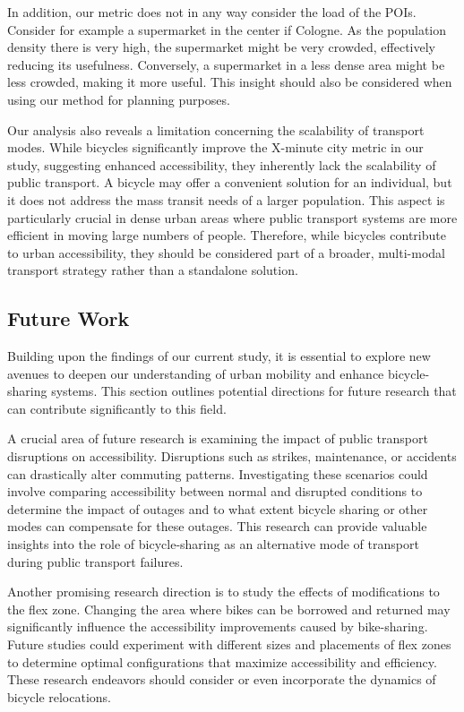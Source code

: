 In addition, our metric does not in any way consider the load of the POIs.
Consider for example a supermarket in the center if Cologne.
As the population density there is very high, the supermarket might be very crowded, effectively reducing its usefulness.
Conversely, a supermarket in a less dense area might be less crowded, making it more useful.
This insight should also be considered when using our method for planning purposes.

Our analysis also reveals a limitation concerning the scalability of transport modes. 
While bicycles significantly improve the X-minute city metric in our study, suggesting enhanced accessibility, they inherently lack the scalability of public transport. 
A bicycle may offer a convenient solution for an individual, but it does not address the mass transit needs of a larger population. 
This aspect is particularly crucial in dense urban areas where public transport systems are more efficient in moving large numbers of people. 
Therefore, while bicycles contribute to urban accessibility, they should be considered part of a broader, multi-modal transport strategy rather than a standalone solution.


\subsection{Future Work}
\label{sec:future_work}

Building upon the findings of our current study, it is essential to explore new avenues to deepen our understanding of urban mobility and enhance bicycle-sharing systems. 
This section outlines potential directions for future research that can contribute significantly to this field.

A crucial area of future research is examining the impact of public transport disruptions on accessibility.
Disruptions such as strikes, maintenance, or accidents can drastically alter commuting patterns. 
Investigating these scenarios could involve comparing accessibility between normal and disrupted conditions to determine the impact of outages and to what extent bicycle sharing or other modes can compensate for these outages.
This research can provide valuable insights into the role of bicycle-sharing as an alternative mode of transport during public transport failures.

Another promising research direction is to study the effects of modifications to the flex zone. 
Changing the area where bikes can be borrowed and returned may significantly influence the accessibility improvements caused by bike-sharing. 
Future studies could experiment with different sizes and placements of flex zones to determine optimal configurations that maximize accessibility and efficiency.
These research endeavors should consider or even incorporate the dynamics of bicycle relocations.

